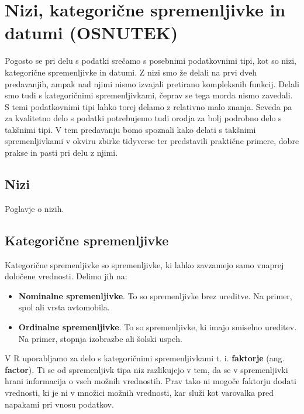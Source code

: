 \documentclass[
]{book}
\providecommand{\tightlist}{%
  \setlength{\itemsep}{0pt}\setlength{\parskip}{0pt}}
\begin{document}
\hypertarget{nizi-kategoriux10dne-spremenljivke-in-datumi-osnutek}{%
\chapter{Nizi, kategorične spremenljivke in datumi (OSNUTEK)}\label{nizi-kategoriux10dne-spremenljivke-in-datumi-osnutek}}

Pogosto se pri delu s podatki srečamo s posebnimi podatkovnimi tipi, kot so nizi, kategorične spremenljivke in datumi. Z nizi smo že delali na prvi dveh predavanjih, ampak nad njimi nismo izvajali pretirano kompleksnih funkcij. Delali smo tudi s kategoričnimi spremenljivkami, čeprav se tega morda nismo zavedali. S temi podatkovnimi tipi lahko torej delamo z relativno malo znanja. Seveda pa za kvalitetno delo s podatki potrebujemo tudi orodja za bolj podrobno delo s takšnimi tipi. V tem predavanju bomo spoznali kako delati s takšnimi spremenljivkami v okviru zbirke tidyverse ter predstavili praktične primere, dobre prakse in pasti pri delu z njimi.

\hypertarget{nizi}{%
\section{Nizi}\label{nizi}}

Poglavje o nizih.

\hypertarget{kategoriux10dne-spremenljivke}{%
\section{Kategorične spremenljivke}\label{kategoriux10dne-spremenljivke}}

Kategorične spremenljivke so spremenljivke, ki lahko zavzamejo samo vnaprej določene vrednosti. Delimo jih na:

\begin{itemize}
\tightlist
\item
  \textbf{Nominalne spremenljivke}. To so spremenljivke brez ureditve. Na primer, spol ali vrsta avtomobila.
\item
  \textbf{Ordinalne spremenljivke}. To so spremenljivke, ki imajo smiselno ureditev. Na primer, stopnja izobrazbe ali šolski uspeh.
\end{itemize}

V R uporabljamo za delo s kategoričnimi spremenljivkami t. i. \textbf{faktorje} (ang. \textbf{factor}). Ti se od spremenljivk tipa niz razlikujejo v tem, da se v spremenljivki hrani informacija o vseh možnih vrednostih. Prav tako ni mogoče faktorju dodati vrednosti, ki je ni v množici možnih vrednosti, kar služi kot varovalka pred napakami pri vnosu podatkov.
\end{document}
